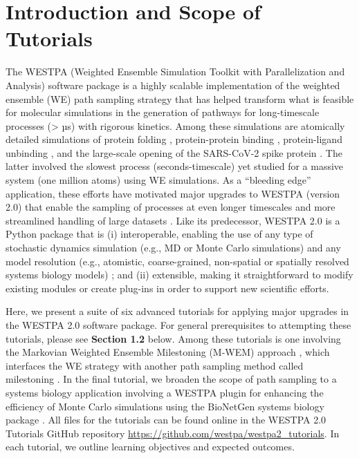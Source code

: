 \section{Introduction and Scope of Tutorials}

The WESTPA (Weighted Ensemble Simulation Toolkit with Parallelization and Analysis) software package is a highly scalable implementation of the weighted ensemble (WE) path sampling strategy \citep{huber_weighted-ensemble_1996,zuckerman_weighted_2017} that has helped transform what is feasible for molecular simulations in the generation of pathways for long-timescale processes (> µs) with rigorous kinetics.
Among these simulations are atomically detailed simulations of protein folding \citep{adhikari_computational_2019}, protein-protein binding \citep{saglam_proteinprotein_2019}, protein-ligand unbinding \citep{lotz_unbiased_2018}, and the large-scale opening of the SARS-CoV-2 spike protein \citep{sztain_glycan_2021}. 
The latter involved the slowest process (seconds-timescale) yet studied for a massive system (one million atoms) using WE simulations. 
As a “bleeding edge” application, these efforts have motivated major upgrades to WESTPA (version 2.0) that enable the sampling of processes at even longer timescales and more streamlined handling of large datasets \citep{russo_westpa_2022}. 
Like its predecessor, WESTPA 2.0 is a Python package that is (i) interoperable, enabling the use of any type of stochastic dynamics simulation (e.g., MD or Monte Carlo simulations) and any model resolution (e.g., atomistic, coarse-grained, non-spatial or spatially resolved systems biology models) \citep{donovan_efficient_2013,donovan_unbiased_2016}; and (ii) extensible, making it straightforward to modify existing modules or create plug-ins in order to support new scientific efforts. 

Here, we present a suite of six advanced tutorials for applying major upgrades in the WESTPA 2.0 software package. 
For general prerequisites to attempting these tutorials, please see \textbf{Section 1.2} below. 
Among these tutorials is one involving the Markovian Weighted Ensemble Milestoning (M-WEM) approach \citep{Ray2022Markovian}, which interfaces the WE strategy with another path sampling method called milestoning \citep{Faradjian2004Computing,West2007Extending}. 
In the final tutorial, we broaden the scope of path sampling to a systems biology application involving a WESTPA plugin for enhancing the efficiency of Monte Carlo simulations using the BioNetGen systems biology package \citep{harris_bionetgen_2016, tapia_mcell-r_2019}. 
All files for the tutorials can be found online in the WESTPA 2.0 Tutorials GitHub repository {\url{https://github.com/westpa/westpa2_tutorials}}. 
In each tutorial, we outline learning objectives and expected outcomes. 

